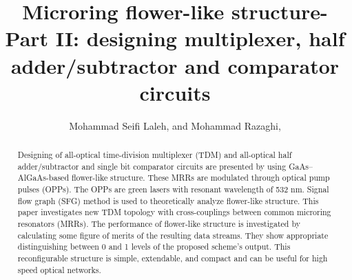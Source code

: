 \documentclass{osa-article}
\begin{document}
\title{Microring flower-like structure- Part II: designing multiplexer, half adder/subtractor and comparator circuits}

\author{Mohammad Seifi Laleh, and Mohammad Razaghi,}

\address{Dept. of Electrical Engineering, University of Kurdistan, Sanandaj, Iran}




\begin{abstract}
Designing of all-optical time-division multiplexer (TDM) and all-optical half adder/subtractor and single bit comparator circuits are presented by using GaAs–AlGaAs-based flower-like structure. These MRRs are modulated through optical pump pulses (OPPs). The OPPs are green lasers with resonant wavelength of 532 nm. Signal flow graph (SFG) method is used to theoretically analyze flower-like structure. This paper investigates new TDM topology with cross-couplings between common microring resonators (MRRs). The performance of flower-like structure is investigated by calculating some figure of merits of the resulting data streams. They show appropriate distinguishing between 0 and 1 levels of the proposed scheme’s output. This reconfigurable structure is simple, extendable, and compact and can be useful for high speed optical networks. 
\end{abstract}

\end{document}
